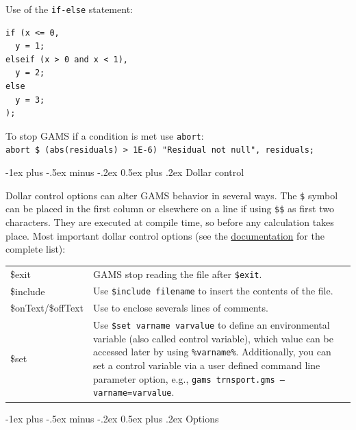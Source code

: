 \documentclass[10pt,landscape,a4paper]{article}
\makeatletter
\renewcommand{\section}{\@startsection{section}{1}{0mm}%
                                {-1ex plus -.5ex minus -.2ex}%
                                {0.5ex plus .2ex}%
                                {\color{blue}\normalfont\large\bfseries}}
\makeatother
\begin{document}
\begin{multicols}{2}
Use of the \verb!if-else! statement:\\
\begin{verbatim}
if (x <= 0,
  y = 1;
elseif (x > 0 and x < 1),
  y = 2;
else
  y = 3;
);
\end{verbatim}

To stop GAMS if a condition is met use \verb!abort!:\\
\verb!abort $ (abs(residuals) > 1E-6) "Residual not null", residuals;!

\section{Dollar control}

Dollar control options can alter GAMS behavior in several ways. The \texttt{\$}
symbol can be placed in the first column or elsewhere on a line if using
\texttt{\$\$} as first two characters. They are executed at compile time, so
before any calculation takes place. Most important dollar control options (see
the
\href{https://www.gams.com/latest/docs/UG_DollarControlOptions.html}{documentation}
for the complete list):
\begin{tabularx}{\columnwidth}{@{}>{\ttfamily}lX@{}}
\$exit & GAMS stop reading the file after \texttt{\$exit}.\\
\$include & Use \texttt{\$include filename} to insert the contents of the
file.\\
\$onText\textrm{/}\$offText & Use to enclose severals lines of comments.\\
\$set & Use \texttt{\$set varname varvalue} to define an environmental
variable (also called control variable), which value can be accessed later by using
\texttt{\%varname\%}. Additionally, you can set a control variable via a user defined
command line parameter option, e.g., \texttt{gams~trnsport.gms --varname=varvalue}.
\end{tabularx}

\section{Options}


\end{multicols}
\end{document}
